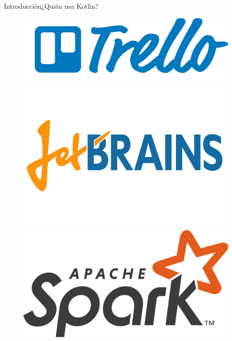 \begin{frame}{Introducción}{¿Quién usa Kotlin?}
  \begin{figure}[!htb]
    \includegraphics[width=\linewidth]{images/introduction/trello_logo}
  \endminipage\hfill
    \includegraphics[width=\linewidth]{images/introduction/jetbrains_logo}
  \endminipage\hfill
    \includegraphics[width=\linewidth]{images/introduction/spark_logo}
  \endminipage
  \end{figure}

\end{frame}
